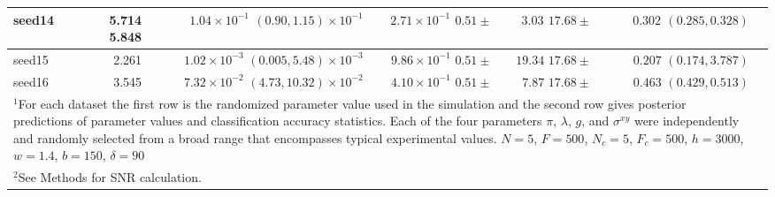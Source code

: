 \begin{table}
\begin{tabular}{lrrrrrr}
\midrule
\specialcell{seed14 \\ \vphantom{fg}}  & \specialcell{5.714\\5.848} &       \specialcell{$1.04 \times 10^{-1}$\\$(0.90, 1.15) \times 10^{-1}$}  &  \specialcell{$2.71 \times 10^{-1}$\\ $0.51 \pm$}  &  \specialcell{$3.03$ \\ $17.68 \pm$}  &  \specialcell{$0.302$ \\ $(0.285, 0.328)$} \\
\midrule
\specialcell{seed15 \\ \vphantom{fg}}  & \specialcell{2.261\\\vphantom{fg}} &       \specialcell{$1.02 \times 10^{-3}$\\$(0.005, 5.48) \times 10^{-3}$}  &  \specialcell{$9.86 \times 10^{-1}$\\ $0.51 \pm$}  &  \specialcell{$19.34$ \\ $17.68 \pm$}  &  \specialcell{$0.207$ \\ $(0.174, 3.787)$} \\
\midrule
\specialcell{seed16 \\ \vphantom{fg}}  & \specialcell{3.545\\\vphantom{fg}} &       \specialcell{$7.32 \times 10^{-2}$\\$(4.73, 10.32) \times 10^{-2}$}  &  \specialcell{$4.10 \times 10^{-1}$\\ $0.51 \pm$}  &  \specialcell{$7.87$ \\ $17.68 \pm$}  &  \specialcell{$0.463$ \\ $(0.429, 0.513)$} \\
\bottomrule
\multicolumn{6}{l}{\footnotesize{\parbox{0.9\textwidth}{$^{1}$For each dataset the first row is the randomized parameter value used in the simulation and the second row gives posterior predictions of parameter values and classification accuracy statistics. Each of the four parameters $\pi$, $\lambda$, $g$, and $\sigma^{xy}$ were independently and randomly selected from a broad range that encompasses typical experimental values. $N = 5$, $F = 500$, $N_c = 5$, $F_c = 500$, $h = 3000$, $w = 1.4$, $b = 150$, $\delta = 90$}}} \\
\multicolumn{6}{l}{\footnotesize{\parbox{0.9\textwidth}{$^2$See Methods for SNR calculation.}}}
\end{tabular}
\end{table}



